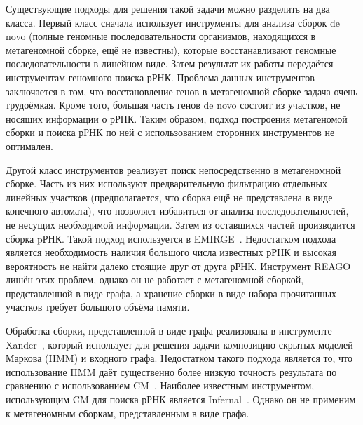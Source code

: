 \documentclass[14pt]{matmex-diploma}
\begin{document}
Существующие подходы для решения такой задачи можно разделить на два класса. Первый класс сначала использует инструменты для анализа сборок de novo (полные геномные последовательности организмов, находящихся в метагеномной сборке, ещё не известны), которые восстанавливают геномные последовательности в линейном виде. Затем результат их работы передаётся инструментам геномного поиска рРНК. Проблема данных инструментов заключается в том, что восстановление генов в метагеномной сборке задача очень трудоёмкая. Кроме того, большая часть генов de novo состоит из участков, не носящих информации о рРНК. Таким образом, подход построения метагеномой сборки и поиска рРНК по ней с использованием сторонних инструментов не оптимален. 

Другой класс инструментов реализует поиск непосредственно в метагеномной сборке. Часть из них используют предварительную фильтрацию отдельных линейных участков (предполагается, что сборка ещё не представлена в виде конечного автомата), что позволяет избавиться от анализа последовательностей, не несущих необходимой информации. Затем из оставшихся частей производится сборка pРНК. Такой подход используется в EMIRGE~\cite{Emirge}. Недостатком подхода является необходимость наличия большого числа известных рРНК и высокая вероятность не найти далеко стоящие друг от друга рРНК. Инструмент REAGO лишён этих проблем, однако он не работает с метагеномной сборкой, представленной в виде графа, а хранение сборки в виде набора прочитанных участков требует большого объёма памяти.

Обработка сборки, представленной в виде графа реализована в инструменте Xander~\cite{Wang2015}, который использует для решения задачи композицию скрытых моделей Маркова (HMM) и входного графа. Недостатком такого подхода является то, что использование HMM даёт существенно более низкую точность результата по сравнению с использованием CM~\cite{EddyComputationalRNA}. Наиболее известным инструментом, использующим CM для поиска рРНК является Infernal~\cite{Infernal}. Однако он не применим к метагеномным сборкам, представленным в виде графа.
\end{document}
